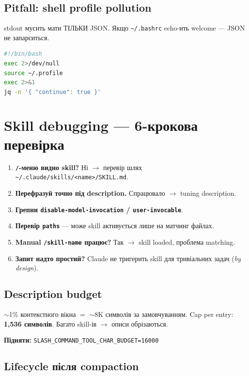 \documentclass[11pt,a4paper]{article}
\begin{document}
\subsection{Pitfall: shell profile pollution}

stdout мусить мати ТІЛЬКИ JSON. Якщо \texttt{\textasciitilde/.bashrc} echo-ить welcome --- JSON не запарситься.

\begin{lstlisting}[language=bash]
#!/bin/bash
exec 2>/dev/null
source ~/.profile
exec 2>&1
jq -n '{ "continue": true }'
\end{lstlisting}

\section{Skill debugging --- 6-крокова перевірка}

\begin{enumerate}
\item \textbf{\texttt{/}-меню видно skill?} Ні $\to$ перевір шлях \texttt{\textasciitilde/.claude/skills/<name>/SKILL.md}.
\item \textbf{Перефразуй точно під description.} Спрацювало $\to$ tuning description.
\item \textbf{Грепни \texttt{disable-model-invocation} / \texttt{user-invocable}}.
\item \textbf{Перевір \texttt{paths}} --- може skill активується лише на матчинг файлах.
\item \textbf{Manual \texttt{/skill-name} працює?} Так $\to$ skill loaded, проблема matching.
\item \textbf{Запит надто простий?} Claude не тригерить skill для тривіальних задач (\textit{by design}).
\end{enumerate}

\subsection{Description budget}

$\sim$1\% контекстного вікна $=$ $\sim$8K символів за замовчуванням. Cap per entry: \textbf{1,536 символів}. Багато skill-ів $\to$ описи обрізаються.

\textbf{Підняти:} \texttt{SLASH\_COMMAND\_TOOL\_CHAR\_BUDGET=16000}

\subsection{Lifecycle після compaction}
\end{document}
